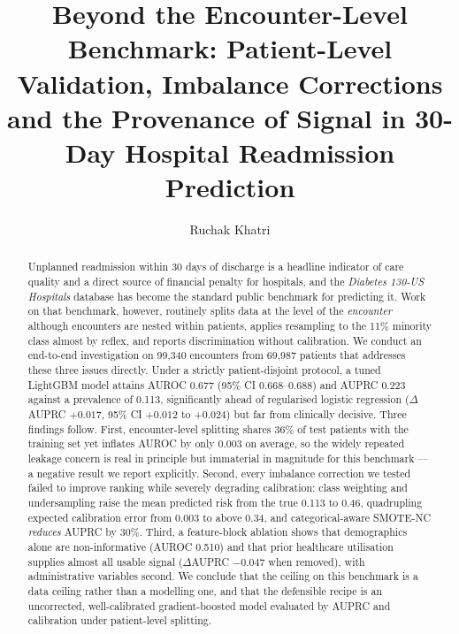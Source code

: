 \documentclass[runningheads]{llncs}
\begin{document}
\title{Beyond the Encounter-Level Benchmark: Patient-Level Validation,
Imbalance Corrections and the Provenance of Signal in 30-Day Hospital
Readmission Prediction}


\author{Ruchak Khatri}

\maketitle

\begin{abstract}
Unplanned readmission within 30 days of discharge is a headline indicator of care
quality and a direct source of financial penalty for hospitals, and the
\emph{Diabetes 130-US Hospitals} database has become the standard public benchmark for
predicting it. Work on that benchmark, however, routinely splits data at the level of
the \emph{encounter} although encounters are nested within patients, applies
resampling to the 11\% minority class almost by reflex, and reports discrimination
without calibration. We conduct an end-to-end investigation on 99{,}340 encounters
from 69{,}987 patients that addresses these three issues directly. Under a strictly
patient-disjoint protocol, a tuned LightGBM model attains AUROC 0.677 (95\% CI
0.668--0.688) and AUPRC 0.223 against a prevalence of 0.113, significantly ahead of
regularised logistic regression ($\Delta$AUPRC $+0.017$, 95\% CI $+0.012$ to
$+0.024$) but far from clinically decisive. Three findings follow. First,
encounter-level splitting shares 36\% of test patients with the training set yet
inflates AUROC by only $0.003$ on average, so the widely repeated leakage concern is
real in principle but immaterial in magnitude for this benchmark --- a negative result
we report explicitly. Second, every imbalance correction we tested failed to improve
ranking while severely degrading calibration: class weighting and undersampling raise
the mean predicted risk from the true 0.113 to 0.46, quadrupling expected calibration
error from 0.003 to above 0.34, and categorical-aware SMOTE-NC \emph{reduces} AUPRC by
30\%. Third, a feature-block ablation shows that demographics alone are
non-informative (AUROC 0.510) and that prior healthcare utilisation supplies almost
all usable signal ($\Delta$AUPRC $-0.047$ when removed), with administrative variables
second. We conclude that the ceiling on this benchmark is a data ceiling rather than a
modelling one, and that the defensible recipe is an uncorrected, well-calibrated
gradient-boosted model evaluated by AUPRC and calibration under patient-level
splitting.

\end{abstract}
\end{document}

